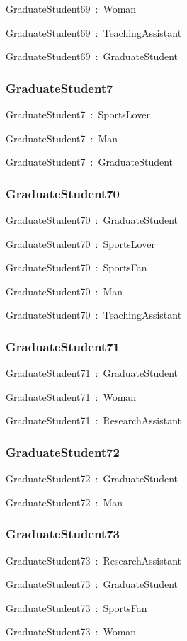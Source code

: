 \documentclass{article}
\begin{document}
GraduateStudent69~:~Woman

GraduateStudent69~:~TeachingAssistant

GraduateStudent69~:~GraduateStudent

\subsubsection*{GraduateStudent7}

GraduateStudent7~:~SportsLover

GraduateStudent7~:~Man

GraduateStudent7~:~GraduateStudent

\subsubsection*{GraduateStudent70}

GraduateStudent70~:~GraduateStudent

GraduateStudent70~:~SportsLover

GraduateStudent70~:~SportsFan

GraduateStudent70~:~Man

GraduateStudent70~:~TeachingAssistant

\subsubsection*{GraduateStudent71}

GraduateStudent71~:~GraduateStudent

GraduateStudent71~:~Woman

GraduateStudent71~:~ResearchAssistant

\subsubsection*{GraduateStudent72}

GraduateStudent72~:~GraduateStudent

GraduateStudent72~:~Man

\subsubsection*{GraduateStudent73}

GraduateStudent73~:~ResearchAssistant

GraduateStudent73~:~GraduateStudent

GraduateStudent73~:~SportsFan

GraduateStudent73~:~Woman
\end{document}
